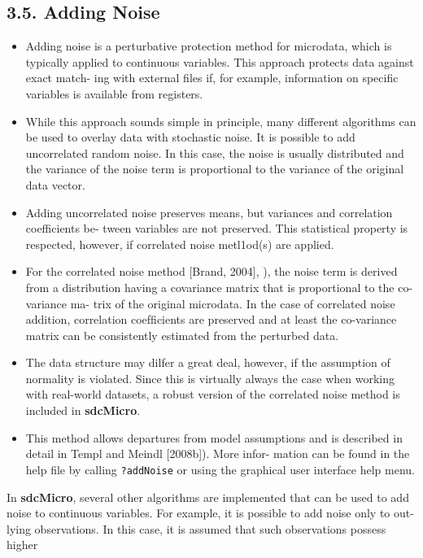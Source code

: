 \documentclass[]{article}
\begin{document}
\subsection*{3.5. Adding Noise}
\begin{itemize}

\item Adding noise is a perturbative protection method for microdata, which is typically
applied to continuous variables. This approach protects data against exact match-
ing with external ﬁles if, for example, information on specific variables is available
from registers.

\item While this approach sounds simple in principle, many different algorithms can
be used to overlay data with stochastic noise. It is possible to add uncorrelated
random noise. In this case, the noise is usually distributed and the variance of
the noise term is proportional to the variance of the original data vector. 
\item Adding
uncorrelated noise preserves means, but variances and correlation coefficients be-
tween variables are not preserved. This statistical property is respected, however,
if correlated noise metl1od(s) are applied.

\item For the correlated noise method [Brand, 2004], ), the noise term is derived from a
distribution having a covariance matrix that is proportional to the co-variance ma-
trix of the original microdata. In the case of correlated noise addition, correlation
coefﬁcients are preserved and at least the co-variance matrix can be consistently
estimated from the perturbed data. 

\item The data structure may dilfer a great deal,
however, if the assumption of normality is violated. Since this is virtually always
the case when working with real-world datasets, a robust version of the correlated
noise method is included in \textbf{sdcMicro}. 
\item This method allows departures from model
assumptions and is described in detail in Templ and Meindl [2008b]). More infor-
mation can be found in the help ﬁle by calling \texttt{?addNoise} or using the graphical
user interface help menu.
\end{itemize}
In \textbf{sdcMicro}, several other algorithms are implemented that can be used to add
noise to continuous variables. For example, it is possible to add noise only to out-
lying observations. In this case, it is assumed that such observations possess higher
\end{document}
